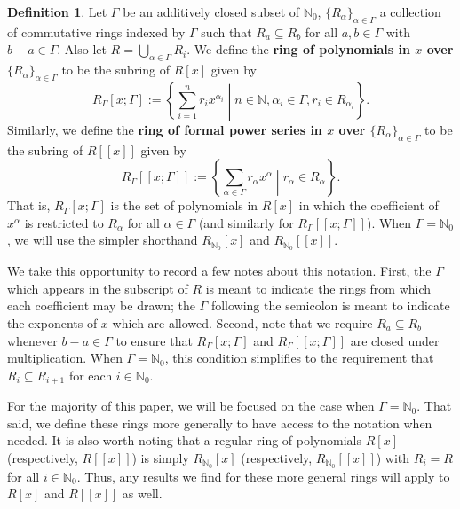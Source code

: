 \documentclass[12pt]{amsart}
\theoremstyle{definition}
\newtheorem{definition}[theorem]{Definition}
\newcommand{\bN}{\mathbb N}
\newcommand{\bNo}{{{\mathbb N}_0}}
\newcommand{\term}[1]{\textbf{\textup{#1}}}
\begin{document}
\begin{definition}
    Let $\Gamma$ be an additively closed subset of $\bN_0$, $\{R_\alpha\}_{\alpha\in\Gamma}$ a collection of commutative rings indexed by $\Gamma$ such that $R_a\subseteq R_b$ for all $a,b\in \Gamma$ with $b-a\in\Gamma$. Also let $R=\bigcup_{\alpha\in \Gamma} R_i$. We define the \term{ring of polynomials in $x$ over $\{R_\alpha\}_{\alpha\in\Gamma}$} to be the subring of $R[x]$ given by
    $$R_{\Gamma}[x;\Gamma]:=\left\{\sum_{i=1}^n r_ix^{\alpha_i}\middle|n\in\bN, \alpha_i\in \Gamma, r_i\in R_{\alpha_i}\right\}.$$
    Similarly, we define the \term{ring of formal power series in $x$ over $\{R_\alpha\}_{\alpha\in\Gamma}$} to be the subring of $R[[x]]$ given by
    $$R_{\Gamma}[[x;\Gamma]]:=\left\{\sum_{\alpha\in\Gamma}r_\alpha x^\alpha\middle|r_\alpha\in R_\alpha\right\}.$$
    That is, $R_{\Gamma}[x;\Gamma]$ is the set of polynomials in $R[x]$ in which the coefficient of $x^\alpha$ is restricted to $R_\alpha$ for all $\alpha\in \Gamma$ (and similarly for $R_{\Gamma}[[x;\Gamma]]$). When $\Gamma=\bNo$, we will use the simpler shorthand $R_{\bNo}[x]$ and $R_\bNo[[x]]$.
\end{definition}

We take this opportunity to record a few notes about this notation. First, the $\Gamma$ which appears in the subscript of $R$ is meant to indicate the rings from which each coefficient may be drawn; the $\Gamma$ following the semicolon is meant to indicate the exponents of $x$ which are allowed. Second, note that we require $R_a\subseteq R_b$ whenever $b-a\in \Gamma$ to ensure that $R_\Gamma[x;\Gamma]$ and $R_\Gamma[[x;\Gamma]]$ are closed under multiplication. When $\Gamma=\bNo$, this condition simplifies to the requirement that $R_i\subseteq R_{i+1}$ for each $i\in\bNo$. 

For the majority of this paper, we will be focused on the case when $\Gamma=\bNo$. That said, we define these rings more generally to have access to the notation when needed. It is also worth noting that a regular ring of polynomials $R[x]$ (respectively, $R[[x]]$) is simply $R_{\bNo}[x]$ (respectively, $R_\bNo[[x]]$) with $R_i=R$ for all $i\in\bNo$. Thus, any results we find for these more general rings will apply to $R[x]$ and $R[[x]]$ as well.

\end{document}
